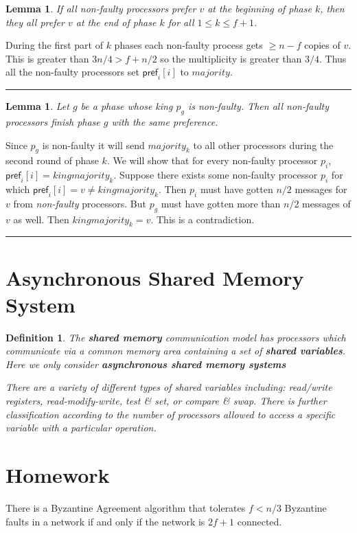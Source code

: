 \documentclass[twoside]{article}
\newtheorem{lemma}[theorem]{Lemma}
\newtheorem{definition}[theorem]{Definition}
\newenvironment{proof}{{\bf Proof:}}{\hfill\rule{2mm}{2mm}}
\newcommand\pref{\mathsf{pref}}
\begin{document}
\begin{lemma}
\label{lem:phasekingValid}
If all non-faulty processors prefer $v$ at the beginning of phase $k$, then they all prefer $v$ at the end of phase $k$ for all $1 \leq k\leq f+1$.
\end{lemma}
\begin{proof}
During the first part of $k$ phases each non-faulty process gets $\geq n-f$ copies of $v$. This is greater than $3n/4 > f + n/2$ so the multiplicity is greater than $3/4$. Thus all the non-faulty processors set $\pref_i[i]$ to $majority$. 
\end{proof}

\begin{lemma}
\label{lem:phasekingAgree}
Let $g$ be a phase whose king $p_g$ is non-faulty. Then all non-faulty processors finish phase $g$ with the same preference.
\end{lemma}
\begin{proof}
Since $p_g$ is non-faulty it will send $majority_k$ to all other processors during the second round of phase $k$. We will show that for every non-faulty processor $p_i$, $\pref_i[i] = kingmajority_k$. Suppose there exists some non-faulty processor $p_i$ for which $\pref_i[i] = v \neq kingmajority_k$. Then $p_i$ must have gotten $n/2$ messages for $v$ from \emph{non-faulty} processors. But $p_g$ must have gotten more than $n/2$ messages of $v$ as well. Then $kingmajority_k = v$. This is a contradiction.
\end{proof}


\section{Asynchronous Shared Memory System}
\begin{definition}
The \textbf{shared memory} communication model has processors which communicate via a common memory area containing a set of \textbf{shared variables}. Here we only consider \textbf{asynchronous shared memory systems}

There are a variety of different types of shared variables including: read/write registers, read-modify-write, test \& set, or compare \& swap. There is further classification according to the number of processors allowed to access a specific variable with a particular operation.
\end{definition}


\section{Homework}
There is a Byzantine Agreement algorithm that tolerates $f < n/3$ Byzantine faults in a network if and only if the network is $2f + 1$ connected. 
\end{document}
